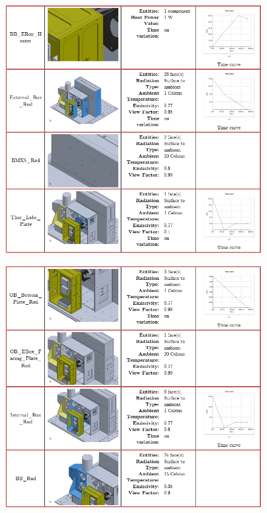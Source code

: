 \begin{figure}
    \centering
    \includegraphics[width=\textwidth]{thermal_load_images/ascent_pt1_TL_images/ascesnt_pt1_5.PNG}
\end{figure}

\begin{figure}
    \centering
    \includegraphics[width=\textwidth]{thermal_load_images/ascent_pt1_TL_images/ascesnt_pt1_6.PNG}
\end{figure}

